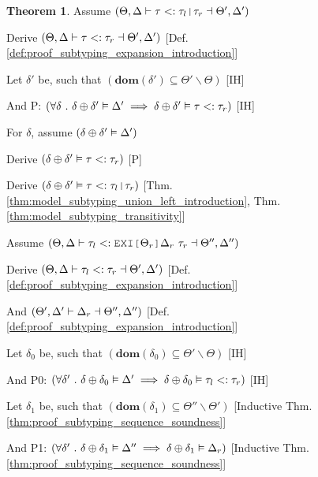 \documentclass[acmsmall]{acmart}
\theoremstyle{definition}
\newtheorem{theorem}{Theorem}[section]
\begin{document}
\begin{theorem}

  \item \N Assume $(
    \Theta, \Delta \entails \tau \subtypes \tau_{l}\J{|}\tau_{r} \given \Theta', \Delta' 
  )$
  \item \I \N Derive $(
    \Theta, \Delta \vdash \tau <: \tau_{r} \dashv \Theta', \Delta' 
  )$ [Def. \ref{def:proof_subtyping_expansion_introduction}]

  \item \I \N Let $\delta'$ be, such that $(
    \textbf{dom}(\delta') \subseteq \Theta' \backslash \Theta
  )$ [IH]
  \item \I \N And P: $(
    \forall \delta \ .\  
    \delta \oplus \delta' \vDash \Delta' 
    \implies 
    \delta \oplus \delta' \vDash \tau <: \tau_{r}
  )$ [IH]
  \item \I \N For $\delta$, 
    assume $(\delta \oplus \delta' \vDash \Delta')$
  \item \I\I \N Derive $(
    \delta \oplus \delta' \vDash \tau <: \tau_{r}
  )$ [P]
  \item \I\I \N Derive $(
    \delta \oplus \delta' \satisfies \tau \subtypes \tau_l \J{|} \tau_r
  )$ [Thm. \ref{thm:model_subtyping_union_left_introduction}, Thm. \ref{thm:model_subtyping_transitivity}]


  \item \N Assume $(
    \Theta, \Delta \entails 
    \tau_l
    \subtypes 
    \J{EXI[}\Theta_r\J{]}\Delta_r\ \tau_r \given \Theta'', \Delta'' 
  )$
  \item \I \N Derive $(
    \Theta, \Delta \vdash \tau_l <: \tau_r \dashv \Theta', \Delta'
  )$ [Def. \ref{def:proof_subtyping_expansion_introduction}]
  \item \I \N And $(
    \Theta', \Delta' \vdash \Delta_r \dashv \Theta'', \Delta'' 
  )$ [Def. \ref{def:proof_subtyping_expansion_introduction}]

  \item \I \N Let $\delta_0$ be, such that $(
    \textbf{dom}(\delta_0) \subseteq \Theta' \backslash \Theta
  )$ [IH]
  \item \I \N And P0: $(
    \forall \delta' \ .\  
    \delta \oplus \delta_0 \vDash \Delta' 
    \implies 
    \delta \oplus \delta_0 \vDash \tau_l <: \tau_r
  )$ [IH]

  \item \I \N Let $\delta_1$ be, such that $(
    \textbf{dom}(\delta_1) \subseteq \Theta'' \backslash \Theta'
  )$ [Inductive Thm. \ref{thm:proof_subtyping_sequence_soundness}]
  \item \I \N And P1: $(
    \forall \delta' \ .\  
    \delta \oplus \delta_1 \vDash \Delta'' 
    \implies 
    \delta \oplus \delta_1 \vDash \Delta_r 
  )$ [Inductive Thm. \ref{thm:proof_subtyping_sequence_soundness}]



\end{theorem}
\end{document}
